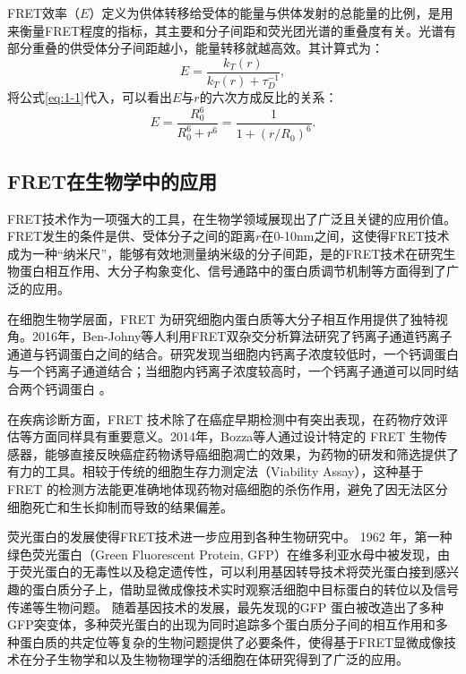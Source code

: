 FRET效率（$E$）定义为供体转移给受体的能量与供体发射的总能量的比例，是用来衡量FRET程度的指标，其主要和分子间距和荧光团光谱的重叠度有关。光谱有部分重叠的供受体分子间距越小，能量转移就越高效。其计算式为：
\begin{equation}
    {E}=\frac{k_T(r)}{k_T(r)+\tau^{-1}_{D}},
\end{equation}
将公式\ref{eq:1-1}代入，可以看出$E$与$r$的六次方成反比的关系：
\begin{equation}
    E=\frac{R_0^6}{R_0^6+r^6}=\frac{1}{1+(r/R_0)^6}.
\end{equation}
\fi

\subsection{FRET在生物学中的应用}

\ifshowtext
FRET技术作为一项强大的工具，在生物学领域展现出了广泛且关键的应用价值。
FRET发生的条件是供、受体分子之间的距离$r$在0-10nm之间，这使得FRET技术成为一种“纳米尺”，能够有效地测量纳米级的分子间距，是的FRET技术在研究生物蛋白相互作用、大分子构象变化、信号通路中的蛋白质调节机制等方面得到了广泛的应用。

在细胞生物学层面，FRET 为研究细胞内蛋白质等大分子相互作用提供了独特视角。2016年，Ben-Johny等人利用FRET双杂交分析算法研究了钙离子通道钙离子通道与钙调蛋白之间的结合。研究发现当细胞内钙离子浓度较低时，一个钙调蛋白与一个钙离子通道结合；当细胞内钙离子浓度较高时，一个钙离子通道可以同时结合两个钙调蛋白 。

在疾病诊断方面，FRET 技术除了在癌症早期检测中有突出表现，在药物疗效评估等方面同样具有重要意义。2014年，Bozza等人通过设计特定的 FRET 生物传感器，能够直接反映癌症药物诱导癌细胞凋亡的效果，为药物的研发和筛选提供了有力的工具。相较于传统的细胞生存力测定法（Viability Assay），这种基于 FRET 的检测方法能更准确地体现药物对癌细胞的杀伤作用，避免了因无法区分细胞死亡和生长抑制而导致的结果偏差。

荧光蛋白的发展使得FRET技术进一步应用到各种生物研究中。
1962 年，第一种绿色荧光蛋白（Green Fluorescent Protein, GFP）在维多利亚水母中被发现，由于荧光蛋白的无毒性以及稳定遗传性，可以利用基因转导技术将荧光蛋白接到感兴趣的蛋白质分子上，借助显微成像技术实时观察活细胞中目标蛋白的转位以及信号传递等生物问题。
随着基因技术的发展，最先发现的GFP 蛋白被改造出了多种GFP突变体，多种荧光蛋白的出现为同时追踪多个蛋白质分子间的相互作用和多种蛋白质的共定位等复杂的生物问题提供了必要条件，使得基于FRET显微成像技术在分子生物学和以及生物物理学的活细胞在体研究得到了广泛的应用。
\fi


